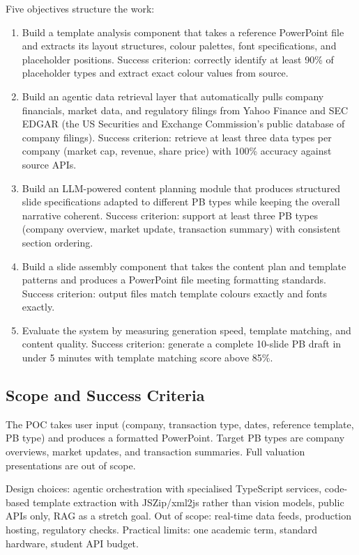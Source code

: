 Five objectives structure the work:

\begin{enumerate}
    \item Build a template analysis component that takes a reference PowerPoint file and extracts its layout structures, colour palettes, font specifications, and placeholder positions. Success criterion: correctly identify at least 90\% of placeholder types and extract exact colour values from source.
    \item Build an agentic data retrieval layer that automatically pulls company financials, market data, and regulatory filings from Yahoo Finance and SEC EDGAR (the US Securities and Exchange Commission's public database of company filings). Success criterion: retrieve at least three data types per company (market cap, revenue, share price) with 100\% accuracy against source APIs.
    \item Build an LLM-powered content planning module that produces structured slide specifications adapted to different PB types while keeping the overall narrative coherent. Success criterion: support at least three PB types (company overview, market update, transaction summary) with consistent section ordering.
    \item Build a slide assembly component that takes the content plan and template patterns and produces a PowerPoint file meeting formatting standards. Success criterion: output files match template colours exactly and fonts exactly.
    \item Evaluate the system by measuring generation speed, template matching, and content quality. Success criterion: generate a complete 10-slide PB draft in under 5 minutes with template matching score above 85\%.
\end{enumerate}

\subsection{Scope and Success Criteria}

The POC takes user input (company, transaction type, dates, reference template, PB type) and produces a formatted PowerPoint. Target PB types are company overviews, market updates, and transaction summaries. Full valuation presentations are out of scope.

Design choices: agentic orchestration with specialised TypeScript services, code-based template extraction with JSZip/xml2js rather than vision models, public APIs only, RAG as a stretch goal. Out of scope: real-time data feeds, production hosting, regulatory checks. Practical limits: one academic term, standard hardware, student API budget.

